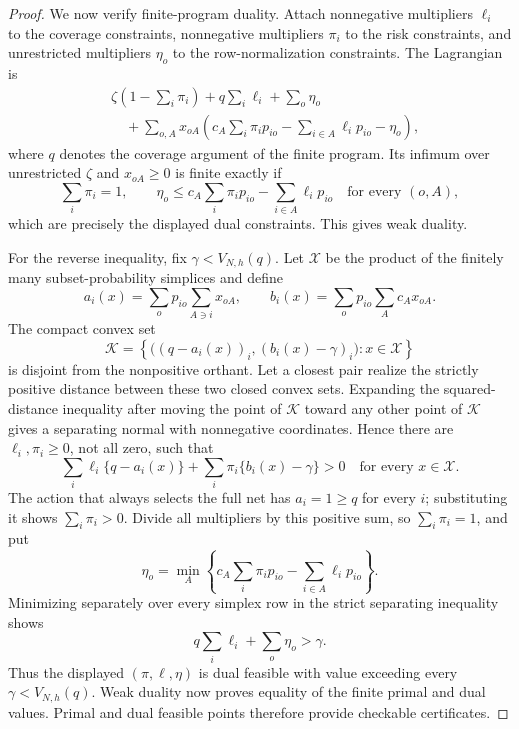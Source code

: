 \documentclass{article}
\begin{document}
\begin{proof}
We now verify finite-program duality.  Attach nonnegative multipliers \(\ell_i\) to the coverage constraints, nonnegative multipliers \(\pi_i\) to the risk constraints, and unrestricted multipliers \(\eta_o\) to the row-normalization constraints.  The Lagrangian is
\[
\begin{aligned}
&\zeta\left(1-\sum_i\pi_i\right)
+q\sum_i\ell_i+\sum_o\eta_o\\
&\quad+
\sum_{o,A}x_{oA}
\left(
c_A\sum_i\pi_ip_{io}
-\sum_{i\in A}\ell_ip_{io}
-\eta_o
\right),
\end{aligned}
\]
where \(q\) denotes the coverage argument of the finite program.  Its infimum over unrestricted \(\zeta\) and \(x_{oA}\ge0\) is finite exactly if
\[
\sum_i\pi_i=1,
\qquad
\eta_o\le
c_A\sum_i\pi_ip_{io}
-\sum_{i\in A}\ell_ip_{io}
\quad\text{for every }(o,A),
\]
which are precisely the displayed dual constraints.  This gives weak duality.

For the reverse inequality, fix \(\gamma<V_{N,h}(q)\).  Let \(\mathcal X\) be the product of the finitely many subset-probability simplices and define
\[
a_i(x)=\sum_op_{io}\sum_{A\ni i}x_{oA},
\qquad
b_i(x)=\sum_op_{io}\sum_Ac_Ax_{oA}.
\]
The compact convex set
\[
\mathcal K=
\left\{
\bigl((q-a_i(x))_i,(b_i(x)-\gamma)_i\bigr):
x\in\mathcal X
\right\}
\]
is disjoint from the nonpositive orthant.  Let a closest pair realize the strictly positive distance between these two closed convex sets.  Expanding the squared-distance inequality after moving the point of \(\mathcal K\) toward any other point of \(\mathcal K\) gives a separating normal with nonnegative coordinates.  Hence there are \(\ell_i,\pi_i\ge0\), not all zero, such that
\[
\sum_i\ell_i\{q-a_i(x)\}
+\sum_i\pi_i\{b_i(x)-\gamma\}>0
\quad\text{for every }x\in\mathcal X.
\]
The action that always selects the full net has \(a_i=1\ge q\) for every \(i\); substituting it shows \(\sum_i\pi_i>0\).  Divide all multipliers by this positive sum, so \(\sum_i\pi_i=1\), and put
\[
\eta_o=
\min_A\left\{
c_A\sum_i\pi_ip_{io}
-\sum_{i\in A}\ell_ip_{io}
\right\}.
\]
Minimizing separately over every simplex row in the strict separating inequality shows
\[
q\sum_i\ell_i+\sum_o\eta_o>\gamma.
\]
Thus the displayed \((\pi,\ell,\eta)\) is dual feasible with value exceeding every \(\gamma<V_{N,h}(q)\).  Weak duality now proves equality of the finite primal and dual values.  Primal and dual feasible points therefore provide checkable certificates.


\end{proof}
\end{document}
